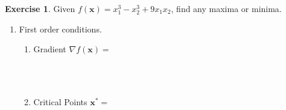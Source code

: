 \documentclass[
]{book}
\theoremstyle{definition}
\theoremstyle{definition}
\theoremstyle{definition}
\newtheorem{exercise}{Exercise}[chapter]
\theoremstyle{remark}
\begin{document}
\begin{exercise}
\protect\hypertarget{exr:unnamed-chunk-59}{}{\label{exr:unnamed-chunk-59} }Given \(f(\mathbf{x})=x_1^3-x_2^3+9x_1x_2\), find any maxima or minima.
\end{exercise}

\begin{enumerate}
  \item First order conditions.  
    \begin{enumerate}
    \item Gradient $\nabla f(\mathbf{x}) = $
        $$\phantom{\begin{pmatrix} \frac{\partial f}{\partial x_1} \\ 
        \frac{\partial f}{\partial x_2}\end{pmatrix} =
        \begin{pmatrix} 3x_1^2+9x_2 \\ -3x_2^2+9x_1 \end{pmatrix}}$$
    \item Critical Points $\mathbf{x^*} =$\\
        $$\phantom{3x_1^2 + 9x_2 = 0 \quad \Rightarrow \quad  9x_2 = 
        -3x_1^2 \quad \Rightarrow \quad  x_2 = -\frac{1}{3}x_1^2}$$
        $$\phantom{-3x_2^2 + 9x_1 = 0 \quad \Rightarrow \quad 
        -3(-\frac{1} {3}x_1^2)^2 + 9x_1 = 0}$$ 
        $$\phantom{\Rightarrow \quad -\frac{1}{3}x_1^4 
        + 9x_1 = 0 \quad \Rightarrow \quad x_1^3 = 27x_1 \quad 
        \Rightarrow \quad x_1 = 3}$$
        $$\phantom{3(3)^2 + 9x_2 = 0 \quad \Rightarrow \quad x_2 = -3}$$    
    \end{enumerate}       
 

\end{enumerate}
\end{document}

